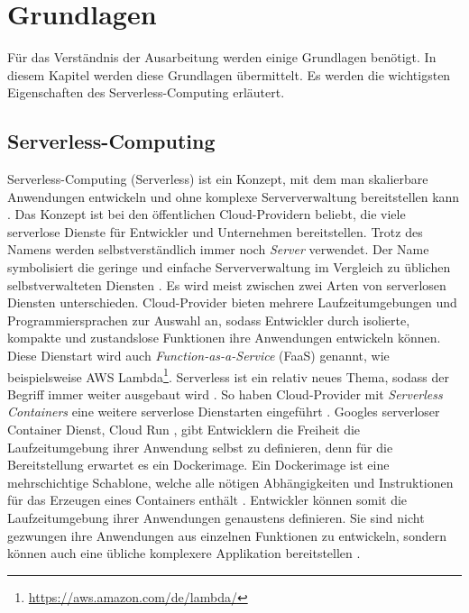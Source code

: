 \chapter{Grundlagen}
Für das Verständnis der Ausarbeitung werden einige Grundlagen benötigt.
In diesem Kapitel werden diese Grundlagen übermittelt.
Es werden die wichtigsten Eigenschaften des Serverless-Computing erläutert.

\section{Serverless-Computing}
Serverless-Computing (Serverless) ist ein Konzept, mit dem man skalierbare Anwendungen
entwickeln und ohne komplexe Serververwaltung bereitstellen kann \cite{CioGov}.
Das Konzept ist bei den öffentlichen Cloud-Providern beliebt, die viele
serverlose Dienste für Entwickler und Unternehmen bereitstellen. Trotz des Namens
werden selbstverständlich immer noch \emph{Server} verwendet. Der Name symbolisiert die geringe
und einfache Serververwaltung im Vergleich zu üblichen selbstverwalteten
Diensten \cite{CNCF}. Es wird meist zwischen zwei Arten von
serverlosen Diensten unterschieden. Cloud-Provider bieten mehrere
Laufzeitumgebungen und Programmiersprachen zur Auswahl an,
sodass Entwickler durch isolierte, kompakte und zustandslose Funktionen
ihre Anwendungen entwickeln können. Diese Dienstart wird auch
\emph{Function-as-a-Service} (FaaS) genannt, wie beispielsweise
AWS Lambda\footnote{\url{https://aws.amazon.com/de/lambda/}}.
Serverless ist ein relativ neues Thema, sodass
der Begriff immer weiter ausgebaut wird \cite{ServerlessTrends}.
So haben Cloud-Provider mit \emph{Serverless Containers}
eine weitere serverlose Dienstarten eingeführt \cite{ServerlessContainers}.
Googles serverloser Container Dienst, Cloud Run \cite{CloudRun}, gibt Entwicklern die Freiheit die Laufzeitumgebung ihrer Anwendung
selbst zu definieren, denn für die Bereitstellung erwartet es
ein Dockerimage. Ein Dockerimage ist eine mehrschichtige Schablone, welche
alle nötigen Abhängigkeiten und Instruktionen für das
Erzeugen eines Containers enthält
\cite{DockerDocs} \cite{RedHatDockerImage}.
Entwickler können somit die Laufzeitumgebung ihrer Anwendungen
genaustens definieren. Sie sind nicht gezwungen
ihre Anwendungen aus einzelnen Funktionen zu entwickeln,
sondern können auch eine übliche komplexere Applikation bereitstellen
\cite{ServerlessTrends}.

